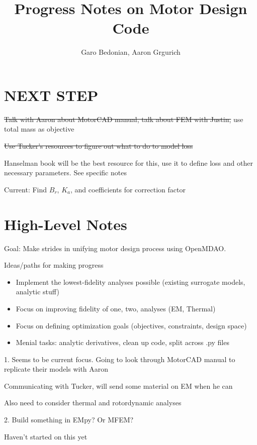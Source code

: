\documentclass[10pt]{article}
\begin{document}
\title{Progress Notes on Motor Design Code}
\author{Garo Bedonian, Aaron Grgurich}

\maketitle

\section{NEXT STEP}

\sout{Talk with Aaron about MotorCAD manual, talk about FEM with Justin,} use total mass as objective

\sout{Use Tucker's resources to figure out what to do to model loss}

Hanselman book will be the best resource for this, use it to define loss and other necessary parameters. See specific notes

Current: Find $B_r$, $K_a$, and coefficients for correction factor

\section{High-Level Notes}

Goal: Make strides in unifying motor design process using OpenMDAO.

Ideas/paths for making progress 
\begin{itemize}
	\item Implement the lowest-fidelity analyses possible (existing surrogate models, analytic stuff)
	\item Focus on improving fidelity of one, two, analyses (EM, Thermal)
	\item Focus on defining optimization goals (objectives, constraints, design space)
  \item Menial tasks: analytic derivatives, clean up code, split across .py files
\end{itemize}

1. 
Seems to be current focus.
Going to look through MotorCAD manual to replicate their models with Aaron

Communicating with Tucker, will send some material on EM when he can

Also need to consider thermal and rotordynamic analyses

2.
Build something in EMpy?
Or MFEM?

Haven't started on this yet
\end{document}
